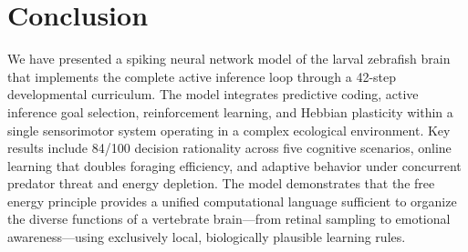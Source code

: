 \documentclass[12pt]{article}
\begin{document}
\section{Conclusion}\label{sec:conclusion}

We have presented a spiking neural network model of the larval
zebrafish brain that implements the complete active inference loop
through a 42-step developmental curriculum.
The model integrates predictive coding, active inference goal
selection, reinforcement learning, and Hebbian plasticity within
a single sensorimotor system operating in a complex ecological
environment.
Key results include 84/100 decision rationality across five
cognitive scenarios, online learning that doubles foraging efficiency,
and adaptive behavior under concurrent predator threat and energy
depletion.
The model demonstrates that the free energy principle provides a
unified computational language sufficient to organize the diverse
functions of a vertebrate brain---from retinal sampling to emotional
awareness---using exclusively local, biologically plausible learning
rules.
\end{document}
